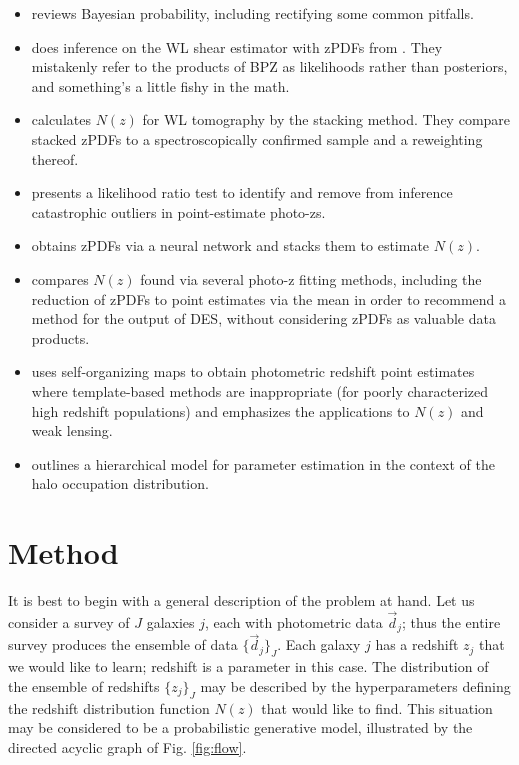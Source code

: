 \documentclass[preprint]{aastex}
\begin{document}
\begin{itemize}
\item \citet{hog12} reviews Bayesian probability, including rectifying some common pitfalls.
\item \citet{app12} does inference on the WL shear estimator with zPDFs from \citet{kel12}.  They mistakenly refer to the products of BPZ as likelihoods rather than posteriors, and something's a little fishy in the math.
\item \citet{ben12} calculates $N(z)$ for WL tomography by the stacking method.  They compare stacked zPDFs to a spectroscopically confirmed sample and a reweighting thereof.
\item \citet{gor13} presents a likelihood ratio test to identify and remove from inference catastrophic outliers in point-estimate photo-zs.
\item \citet{bon13} obtains zPDFs via a neural network and stacks them to estimate $N(z)$.
\item \citet{bon15} compares $N(z)$ found via several photo-z fitting methods, including the reduction of zPDFs to point estimates via the mean in order to recommend a method for the output of DES, without considering zPDFs as valuable data products.
\item \citet{mas15} uses self-organizing maps to obtain photometric redshift point estimates where template-based methods are inappropriate (for poorly characterized high redshift populations) and emphasizes the applications to $N(z)$ and weak lensing.
\item \citet{mar15} outlines a hierarchical model for parameter estimation in the context of the halo occupation distribution.
\end{itemize}

\clearpage
\section{Method}
\label{sec:meth}

It is best to begin with a general description of the problem at hand.  Let us consider a survey of $J$ galaxies $j$, each with photometric data $\vec{d}_{j}$; thus the entire survey produces the ensemble of data $\{\vec{d}_{j}\}_{J}$.  Each galaxy $j$ has a redshift $z_{j}$ that we would like to learn; redshift is a parameter in this case.  The distribution of the ensemble of redshifts $\{z_{j}\}_{J}$ may be described by the hyperparameters defining the redshift distribution function $N(z)$ that would like to find.  This situation may be considered to be a probabilistic generative model, illustrated by the directed acyclic graph of Fig. \ref{fig:flow}.  
\end{document}
